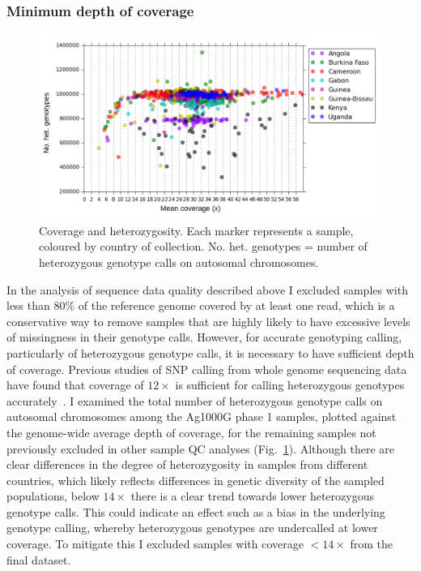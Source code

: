\begin{refsection}
\subsubsection{Minimum depth of coverage}


\begin{figure}[t!]
\centering
\includegraphics[width=\textwidth]{artwork/chapter3/coverage_hetz.pdf}
\caption{Coverage and heterozygosity.
%
Each marker represents a sample, coloured by country of collection.
%
No. het. genotypes = number of heterozygous genotype calls on autosomal chromosomes.
%
}
%
\label{fig:ch3-coverage_hetz}
\end{figure}


In the analysis of sequence data quality described above I excluded samples with less than 80\% of the reference genome covered by at least one read, which is a conservative way to remove samples that are highly likely to have excessive levels of missingness in their genotype calls.
%
However, for accurate genotyping calling, particularly of heterozygous genotype calls, it is necessary to have sufficient depth of coverage.
%
Previous studies of SNP calling from whole genome sequencing data have found that coverage of $12\times$ is sufficient for calling heterozygous genotypes accurately~\parencite{Meynert2014}.
%
I examined the total number of heterozygous genotype calls on autosomal chromosomes among the Ag1000G phase 1 samples, plotted against the genome-wide average depth of coverage, for the remaining samples not previously excluded in other sample QC analyses (Fig.~\ref{fig:ch3-coverage_hetz}).
%
Although there are clear differences in the degree of heterozygosity in samples from different countries, which likely reflects differences in genetic diversity of the sampled populations, below $14\times$ there is a clear trend towards lower heterozygous genotype calls.
%
This could indicate an effect such as a bias in the underlying genotype calling, whereby heterozygous genotypes are undercalled at lower coverage.
%
To mitigate this I excluded samples with coverage $<14\times$ from the final dataset.




\end{refsection}
